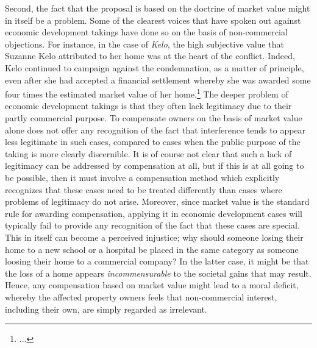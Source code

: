 Second, the fact that the proposal is based on the doctrine of market value might in itself be a problem. Some of the clearest voices that have spoken out against economic development takings have done so on the basis of non-commercial objections. For instance, in the case of {\it Kelo}, the high subjective value that Suzanne Kelo attributed to her home was at the heart of the conflict. Indeed, Kelo continued to campaign against the condemnation, as a matter of principle, even after she had accepted a financial settlement whereby she was awarded some four times the estimated market value of her home.\footnote{...} The deeper problem of economic development takings is that they often lack legitimacy due to their partly commercial purpose. To compensate owners on the basis of market value alone does not offer any recognition of the fact that interference tends to appear less legitimate in such cases, compared to cases when the public purpose of the taking is more clearly discernible. It is of course not clear that such a lack of legitimacy can be addressed by compensation at all, but if this is at all going to be possible, then it must involve a compensation method which explicitly recognizes that these cases need to be treated differently than cases where problems of legitimacy do not arise. Moreover, since market value is the standard rule for awarding compensation, applying it in economic development cases will typically fail to provide any recognition of the fact that these cases are special. This in itself can become a perceived injustice; why should someone losing their home to a new school or a hospital be placed in the same category as someone loosing their home to a commercial company? In the latter case, it might be that the loss of a home appears {\it incommensurable} to the societal gains that may result. Hence, any compensation based on market value might lead to a moral deficit, whereby the affected property owners feels that non-commercial interest, including their own, are simply regarded as irrelevant.

